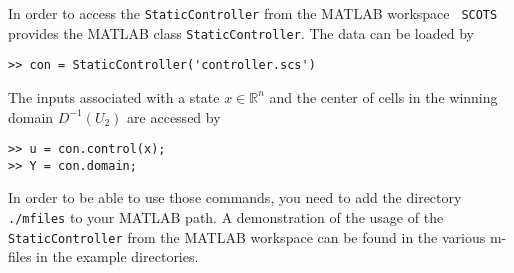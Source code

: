 \documentclass[a4paper]{amsart}
\newcommand{\R}{\mathbb{R}}
\begin{document}
In order to access the {\tt StaticController} from the MATLAB workspace {\tt
SCOTS} provides the MATLAB class {\tt StaticController}. The data can be loaded
by
\begin{lstlisting}[basicstyle=\small\ttfamily]
>> con = StaticController('controller.scs')
\end{lstlisting}
The inputs associated with a state $x\in \R^n$ and the center of cells in the
winning domain $D^{-1}(U_2)$ are accessed by
\begin{lstlisting}[basicstyle=\small\ttfamily]
>> u = con.control(x);
>> Y = con.domain;
\end{lstlisting}
In order to be able to use those commands, you need to add the directory {\tt
./mfiles} to your MATLAB path.
A demonstration of the usage of the {\tt StaticController} from the MATLAB
workspace can be found in the various m-files in the example directories.



%

%
%




\newpage

\printbibliography
\end{document}
